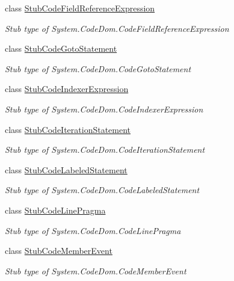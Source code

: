 \begin{DoxyCompactItemize}
class \hyperlink{class_system_1_1_code_dom_1_1_fakes_1_1_stub_code_field_reference_expression}{Stub\-Code\-Field\-Reference\-Expression}
\begin{DoxyCompactList}\small\item\em Stub type of System.\-Code\-Dom.\-Code\-Field\-Reference\-Expression\end{DoxyCompactList}\item 
class \hyperlink{class_system_1_1_code_dom_1_1_fakes_1_1_stub_code_goto_statement}{Stub\-Code\-Goto\-Statement}
\begin{DoxyCompactList}\small\item\em Stub type of System.\-Code\-Dom.\-Code\-Goto\-Statement\end{DoxyCompactList}\item 
class \hyperlink{class_system_1_1_code_dom_1_1_fakes_1_1_stub_code_indexer_expression}{Stub\-Code\-Indexer\-Expression}
\begin{DoxyCompactList}\small\item\em Stub type of System.\-Code\-Dom.\-Code\-Indexer\-Expression\end{DoxyCompactList}\item 
class \hyperlink{class_system_1_1_code_dom_1_1_fakes_1_1_stub_code_iteration_statement}{Stub\-Code\-Iteration\-Statement}
\begin{DoxyCompactList}\small\item\em Stub type of System.\-Code\-Dom.\-Code\-Iteration\-Statement\end{DoxyCompactList}\item 
class \hyperlink{class_system_1_1_code_dom_1_1_fakes_1_1_stub_code_labeled_statement}{Stub\-Code\-Labeled\-Statement}
\begin{DoxyCompactList}\small\item\em Stub type of System.\-Code\-Dom.\-Code\-Labeled\-Statement\end{DoxyCompactList}\item 
class \hyperlink{class_system_1_1_code_dom_1_1_fakes_1_1_stub_code_line_pragma}{Stub\-Code\-Line\-Pragma}
\begin{DoxyCompactList}\small\item\em Stub type of System.\-Code\-Dom.\-Code\-Line\-Pragma\end{DoxyCompactList}\item 
class \hyperlink{class_system_1_1_code_dom_1_1_fakes_1_1_stub_code_member_event}{Stub\-Code\-Member\-Event}
\begin{DoxyCompactList}\small\item\em Stub type of System.\-Code\-Dom.\-Code\-Member\-Event\end{DoxyCompactList}\item 

\end{DoxyCompactItemize}

